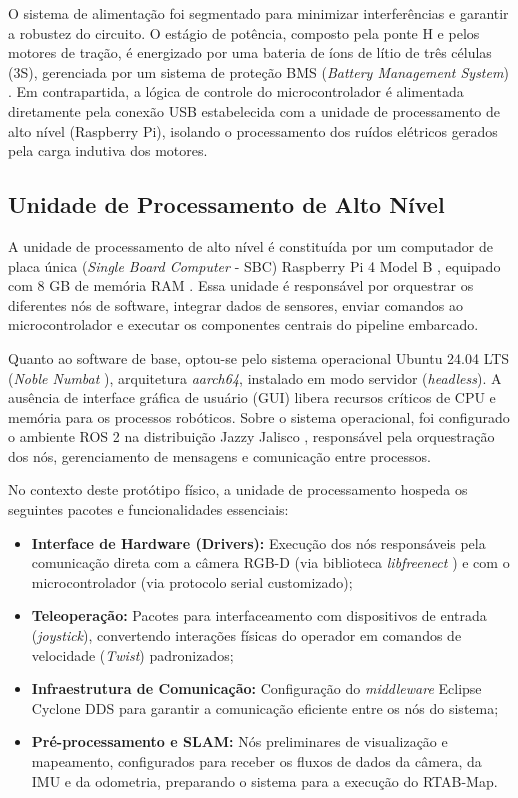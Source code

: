 O sistema de alimentação foi segmentado para minimizar interferências e garantir a robustez do circuito. O estágio de potência, composto pela ponte H e pelos motores de tração, é energizado por uma bateria de íons de lítio de três células (3S), gerenciada por um sistema de proteção BMS (\textit{Battery Management System}) \cite{texas_instruments2022bq78_bms}. Em contrapartida, a lógica de controle do microcontrolador é alimentada diretamente pela conexão USB estabelecida com a unidade de processamento de alto nível (Raspberry Pi), isolando o processamento dos ruídos elétricos gerados pela carga indutiva dos motores.

\subsection{Unidade de Processamento de Alto Nível}

A unidade de processamento de alto nível é constituída por um computador de placa única (\textit{Single Board Computer} - SBC) Raspberry Pi 4 Model B \cite{raspberrypi2019raspberrypi}, equipado com 8 GB de memória RAM \cite{broadcom2021bcm2711arm}. Essa unidade é responsável por orquestrar os diferentes nós de software, integrar dados de sensores, enviar comandos ao microcontrolador e executar os componentes centrais do pipeline embarcado.

Quanto ao software de base, optou-se pelo sistema operacional Ubuntu 24.04 LTS (\textit{Noble Numbat} \cite{canonical2024ubuntu2404}), arquitetura \textit{aarch64}, instalado em modo servidor (\textit{headless}). A ausência de interface gráfica de usuário (GUI) libera recursos críticos de CPU e memória para os processos robóticos. Sobre o sistema operacional, foi configurado o ambiente ROS 2 na distribuição Jazzy Jalisco \cite{openrobotics2024jazzy}, responsável pela orquestração dos nós, gerenciamento de mensagens e comunicação entre processos.

No contexto deste protótipo físico, a unidade de processamento hospeda os seguintes pacotes e funcionalidades essenciais:

\begin{itemize}
    \item \textbf{Interface de Hardware (Drivers):} Execução dos nós responsáveis pela comunicação direta com a câmera RGB-D (via biblioteca \textit{libfreenect} \cite{openkinect2010libfreenect}) e com o microcontrolador (via protocolo serial customizado);
    \item \textbf{Teleoperação:} Pacotes para interfaceamento com dispositivos de entrada (\textit{joystick}), convertendo interações físicas do operador em comandos de velocidade (\textit{Twist}) padronizados;
    \item \textbf{Infraestrutura de Comunicação:} Configuração do \textit{middleware} Eclipse Cyclone DDS \cite{eclipse2021eclipsecyclonedds} para garantir a comunicação eficiente entre os nós do sistema;
    \item \textbf{Pré-processamento e SLAM:} Nós preliminares de visualização e mapeamento, configurados para receber os fluxos de dados da câmera, da IMU e da odometria, preparando o sistema para a execução do RTAB-Map.
\end{itemize}

